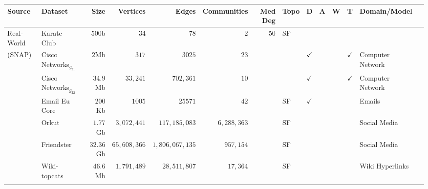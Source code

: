 \begin{landscape}
    
    \begin{table}[t]
        \begin{center}
        {\footnotesize
            \begin{tabular}{ll|rrrrrlccccll} 
            Source      & Dataset                                     &  Size  & Vertices& Edges    & Communities  & Med Deg      &  Topo     &       D       &          A    &       W     &  T             & Domain/Model             \\
                        \hline
            Real-World  & Karate Club~\cite{Zachary1977,Rossi2015}    & $500$b  & $34$   & $78$    & $2$           & $50$         & SF        &               &               &             &                &                           \\
            (SNAP)      & Cisco Networks$_{g_{21}}$~\cite{Madani2022} & $2$Mb  & $317$   &$3025$    & $23$         &              &           &  $\checkmark$ &               &             & $\checkmark$   & Computer Network      \\
                        & Cisco Networks$_{g_{22}}$~\cite{Madani2022} &$34.9$Mb&$33,241$ &$702,361$ & $10$         &              &           &  $\checkmark$ &               &             & $\checkmark$   & Computer Network         \\
                        & Email Eu Core~\cite{Yin2017}                &$200$Kb & $1005$  &$25571$   & $42$         &              & SF        &  $\checkmark$ &               &             &                & Emails                    \\
                        & Orkut~\cite{Yang2012}                       &$1.77$Gb&$3,072,441$&$117,185,083$&$6,288,363$&            & SF        &               &               &             &                & Social Media              \\
                        & Friendster\cite{Yang2012}                   &$32.36$Gb&$65,608,366$&$1,806,067,135$&$957,154$&          & SF        &               &               &             &                & Social Media             \\
                        & Wiki-topcats~\cite{Yin2017}                 &$46.6$Mb&$1,791,489$&$28,511,807$&$17,364$&                & SF        &               &               &             &                & Wiki Hyperlinks       \\
                        &                                             &        &         &          &              &              &           &               &               &             &                &                           \\

\end{tabular}}
\end{center}
\end{table}
\end{landscape}
